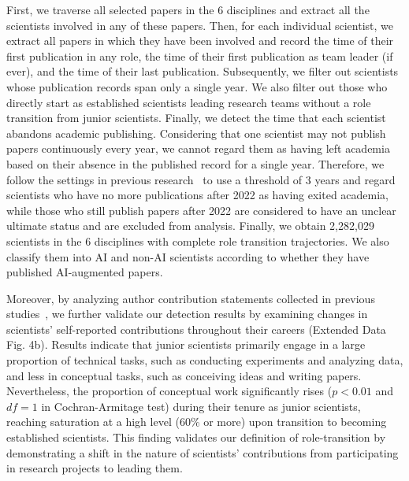 First, we traverse all selected papers in the 6 disciplines and extract all the scientists involved in any of these papers.
Then, for each individual scientist, we extract all papers in which they have been involved and record the time of their first publication in any role, the time of their first publication as team leader (if ever), and the time of their last publication.
Subsequently, we filter out scientists whose publication records span only a single year.
We also filter out those who directly start as established scientists leading research teams without a role transition from junior scientists.
Finally, we detect the time that each scientist abandons academic publishing.
Considering that one scientist may not publish papers continuously every year, we cannot regard them as having left academia based on their absence in the published record for a single year.
Therefore, we follow the settings in previous research~\supercite{milojevic2018changing} to use a threshold of 3 years and regard scientists who have no more publications after 2022 as having exited academia, while those who still publish papers after 2022 are considered to have an unclear ultimate status and are excluded from analysis.
Finally, we obtain 2,282,029 scientists in the 6 disciplines with complete role transition trajectories.
We also classify them into AI and non-AI scientists according to whether they have published AI-augmented papers.

Moreover, by analyzing author contribution statements collected in previous studies~\supercite{xu2022flat,lin2023remote}, we further validate our detection results by examining changes in scientists’ self-reported contributions throughout their careers (Extended Data Fig. 4b).
Results indicate that junior scientists primarily engage in a large proportion of technical tasks, such as conducting experiments and analyzing data, and less in conceptual tasks, such as conceiving ideas and writing papers. Nevertheless, the proportion of conceptual work significantly rises ($p<0.01$ and $df=1$ in Cochran-Armitage test) during their tenure as junior scientists, reaching saturation at a high level (60\% or more) upon transition to becoming established scientists. This finding validates our definition of role-transition by demonstrating a shift in the nature of scientists’ contributions from participating in research projects to leading them.


